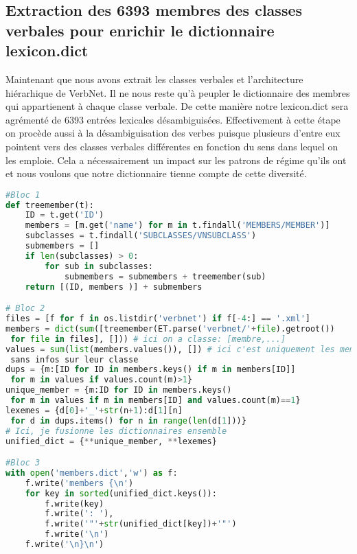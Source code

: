 \subsection{Extraction des 6393 membres des classes verbales pour enrichir le dictionnaire lexicon.dict} \label{extracmembre}

Maintenant que nous avons extrait les classes verbales et l'architecture hiérarhique de VerbNet. Il ne nous reste qu'à peupler le dictionnaire des membres qui appartienent à chaque classe verbale. De cette manière notre lexicon.dict sera agrémenté de 6393 entrées lexicales désambiguisées. Effectivement à cette étape on procède aussi à la désambiguisation des verbes puisque plusieurs d'entre eux pointent vers des classes verbales différentes en fonction du sens dans lequel on les emploie. Cela a nécessairement un impact sur les patrons de régime qu'ils ont et nous voulons que notre dictionnaire tienne compte de cette diversité.

\begin{lstlisting}[language=Python, caption = Code pour ajouter des lexèmes à lexicon.dict]
#Bloc 1
def treemember(t):
    ID = t.get('ID')
    members = [m.get('name') for m in t.findall('MEMBERS/MEMBER')]
    subclasses = t.findall('SUBCLASSES/VNSUBCLASS')
    submembers = []
    if len(subclasses) > 0:
        for sub in subclasses:
            submembers = submembers + treemember(sub)
    return [(ID, members )] + submembers

# Bloc 2
files = [f for f in os.listdir('verbnet') if f[-4:] == '.xml']
members = dict(sum([treemember(ET.parse('verbnet/'+file).getroot())
 for file in files], [])) # ici on a classe: [membre,...]
values = sum(list(members.values()), []) # ici c'est uniquement les membres
 sans infos sur leur classe
dups = {m:[ID for ID in members.keys() if m in members[ID]]
 for m in values if values.count(m)>1}
unique_member = {m:ID for ID in members.keys()
 for m in values if m in members[ID] and values.count(m)==1}
lexemes = {d[0]+'_'+str(n+1):d[1][n]
 for d in dups.items() for n in range(len(d[1]))}
# Ici, je fusionne les dictionnaires ensemble
unified_dict = {**unique_member, **lexemes}

#Bloc 3
with open('members.dict','w') as f:
    f.write('members {\n')
    for key in sorted(unified_dict.keys()):
        f.write(key)
        f.write(': '),
        f.write('"'+str(unified_dict[key])+'"')
        f.write('\n')
    f.write('\n}\n')

\end{lstlisting}

